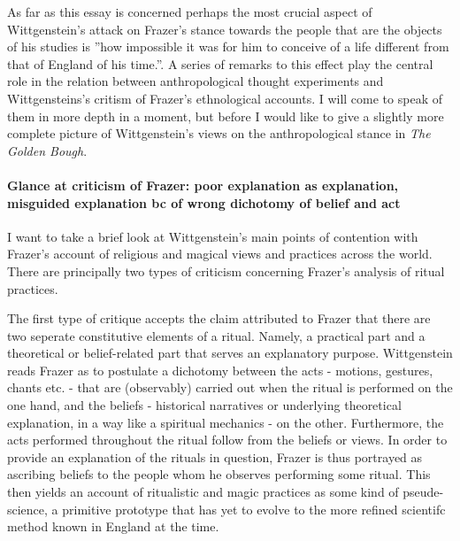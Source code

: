 \documentclass{article}
\begin{document}
As far as this essay is concerned perhaps the most crucial aspect of Wittgenstein's attack on Frazer's stance towards the people that are the objects of his studies is ''how impossible it was for him to conceive of a life different from that of England of his time.''. A series of remarks to this effect play the central role in the relation between anthropological thought experiments and Wittgensteins's critism of Frazer's ethnological accounts. I will come to speak of them in more depth in a moment, but before I would like to give a slightly more complete picture of Wittgenstein's views on the anthropological stance in \textit{The Golden Bough}.
 
\paragraph{Glance at criticism of Frazer: poor explanation as explanation, misguided explanation bc of wrong dichotomy of belief and act}
I want to take a brief look at Wittgenstein's main points of contention with Frazer's account of religious and magical views and practices across the world. There are principally two types of criticism concerning Frazer's analysis of ritual practices. 

The first type of critique accepts the claim attributed to Frazer that there are two seperate constitutive elements of a ritual. Namely, a practical part and a theoretical or belief-related part that serves an explanatory purpose. Wittgenstein reads Frazer as to postulate a dichotomy between the acts - motions, gestures, chants etc. - that are (observably) carried out when the ritual is performed on the one hand, and the beliefs - historical narratives or underlying theoretical explanation, in a way like a spiritual mechanics - on the other. Furthermore, the acts performed throughout the ritual follow from the beliefs or views. In order to provide an explanation of the rituals in question, Frazer is thus portrayed as ascribing beliefs to the people whom he observes performing some ritual. This then yields an account of ritualistic and magic practices as some kind of pseude-science, a primitive prototype that has yet to evolve to the more refined scientifc method known in England at the time. 
\end{document}
